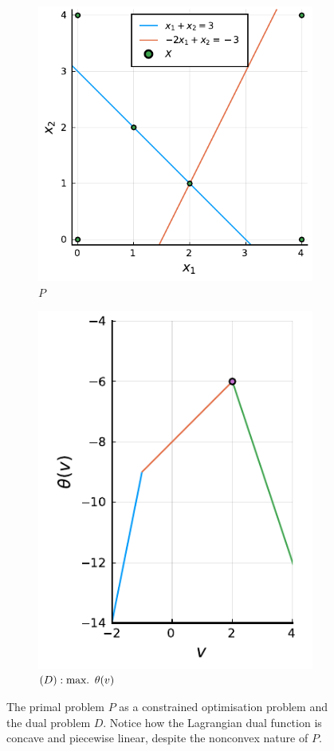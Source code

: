 \begin{figure}[h]
	\centering
	\begin{subfigure}{0.45\textwidth}
		\centering
		\includegraphics[scale=0.8]{part_2/chapter_8/figures/ex2_1.pdf}
		\caption{$P$} \label{fig:ex2_P}	
	\end{subfigure}
	\begin{subfigure}{0.45\textwidth}
		\centering
		\includegraphics[scale=0.8]{part_2/chapter_8/figures/ex2_2.pdf}
		\caption{$(D): \mathop{\text{max.~}} \theta(v)$} \label{fig:ex2_D}	
	\end{subfigure}
	\caption{The primal problem $P$ as a constrained optimisation problem and the dual problem $D$. Notice how the Lagrangian dual function is concave and piecewise linear, despite the nonconvex nature of $P$.}
\end{figure}

